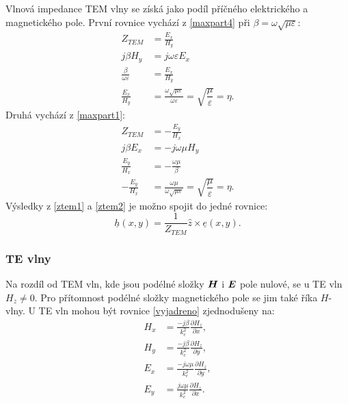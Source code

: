 \documentclass[12pt,a4paper,oneside]{article}
\numberwithin{equation}{section} %
\numberwithin{figure}{section} %
\numberwithin{table}{section} %
\renewcommand{\vec}[1]{\mbox{\boldmath$#1$}} %
\newcommand{\faz}[1]{{\underline{#1}}} %
\begin{document}
Vlnová impedance TEM vlny se získá jako podíl příčného elektrického a magnetického pole. První rovnice vychází z \ref{maxpart4} při $\beta = \omega \sqrt{\mu \varepsilon}$:
\begin{subequations}
\label{ztem1}
\begin{align}
Z_{TEM} &= \frac{E_x}{H_y}
\\
j \beta H_y &= j \omega \varepsilon E_x
\\
\frac{\beta}{\omega \varepsilon} &= \frac{E_x}{H_y}
\\
\frac{E_x}{H_y} &= \frac{\omega \sqrt{\mu \varepsilon}}{\omega \varepsilon} = \sqrt{\dfrac{\mu}{\varepsilon}} = \eta .
\end{align}
\end{subequations}
Druhá vychází z \ref{maxpart1}:
\begin{subequations}
\label{ztem2}
\begin{align}
Z_{TEM} &= - \frac{E_y}{H_x}
\\
j \beta E_x &= - j \omega \mu H_y
\\
\frac{E_y}{H_x} &= - \frac{\omega \mu}{\beta}
\\
- \frac{E_y}{H_x} &= \frac{\omega \mu}{\omega \sqrt{\mu \varepsilon}} = \sqrt{\dfrac{\mu}{\varepsilon}} = \eta .
\end{align}
\end{subequations}
Výsledky z \ref{ztem1} a \ref{ztem2} je možno spojit do jedné rovnice:
\begin{equation}
\faz{h} (x, y) = \frac{1}{Z_{TEM}} \hat{z} \times \faz{e} (x, y) .
\end{equation}


\subsubsection{TE vlny}
Na rozdíl od TEM vln, kde jsou podélné složky $\vec{H}$ i $\vec{E}$ pole nulové, se u TE vln $H_z  \neq 0$. Pro přítomnost podélné složky magnetického pole se jim také říka $H$-vlny. U TE vln mohou být rovnice \ref{vyjadreno} zjednodušeny na:
\begin{subequations}
\begin{align}
H_x &= \frac{-j \beta}{k^2_c} \frac{\partial H_z}{\partial x} ,
\\
H_y &= \frac{-j \beta}{k^2_c} \frac{\partial H_z}{\partial y} ,
\\
E_x &= \frac{-j \omega \mu}{k^2_c} \frac{\partial H_z}{\partial y} ,
\\
E_y &= \frac{j \omega \mu}{k^2_c} \frac{\partial H_z}{\partial x} .
\end{align}
\end{subequations}
\end{document}
